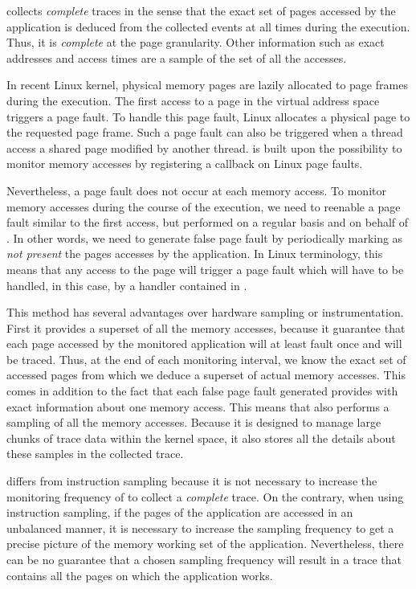 \Moca collects \emph{complete} traces in the sense that the exact set
of pages accessed by the application is deduced from the collected events
at all times during the execution. Thus, it is \emph{complete} at the page granularity.
Other information such as exact addresses and access times are a sample of
the set of all the accesses.

In recent Linux kernel, physical memory pages are lazily allocated to page frames during
the execution. The first access to a page in the virtual address space triggers a page fault.
To handle this page fault, Linux allocates a physical page to the requested page frame.
Such a page fault can also be triggered when a thread access a shared page modified by
another thread. \Moca is built upon the possibility to monitor memory accesses by registering
a callback on Linux page faults.

Nevertheless, a page fault does not occur at each memory access. To monitor memory accesses during
the course of the execution, we need to reenable a page fault similar to the first access, but
performed on a regular basis and on behalf of \Moca.
In other words, we need to generate false page fault by periodically marking as \emph{not present}
the pages accesses by the application.
In Linux terminology, this means that any access to the page will trigger a page fault which
will have to be handled, in this case, by a handler contained in \Moca.

This method has several advantages over hardware sampling or
instrumentation. First it provides a superset of all the memory accesses, because it
guarantee that each page accessed by the monitored application will at least fault once
and will be traced. Thus, at the end of each monitoring interval, we know the exact set
of accessed pages from which we deduce a superset of actual memory accesses.
This comes in addition to the fact that each false page fault generated provides \Moca with
exact information about one memory access. This means that \Moca also performs a sampling
of all the memory accesses. Because it is designed to manage large chunks of trace data
within the kernel space, it also stores all the details about these samples in the collected trace.

\Moca differs from instruction sampling because it is not necessary to increase the monitoring
frequency of \Moca to collect a \emph{complete} trace. On the contrary, when using instruction sampling,
if the pages of the application are accessed in an unbalanced manner, it is necessary to increase
the sampling frequency to get a precise picture of the memory working set of the application.
Nevertheless, there can be no guarantee that a chosen sampling frequency will result in a trace
that contains all the pages on which the application works.

